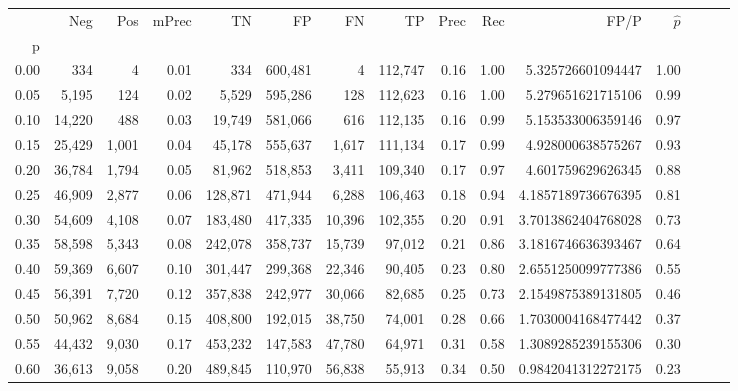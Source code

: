 \begin{tabular}{rrrrrrrrrrrrrrr}
\toprule
{} &     Neg &    Pos & mPrec &       TN &       FP &       FN &       TP &  Prec &   Rec &                  FP/P & $\hat{p}$ \\
p    &         &        &       &          &          &          &          &       &       &                       &           \\
\midrule
0.00 &     334 &      4 &  0.01 &      334 &  600,481 &        4 &  112,747 &  0.16 &  1.00 &     5.325726601094447 &      1.00 \\
0.05 &   5,195 &    124 &  0.02 &    5,529 &  595,286 &      128 &  112,623 &  0.16 &  1.00 &     5.279651621715106 &      0.99 \\
0.10 &  14,220 &    488 &  0.03 &   19,749 &  581,066 &      616 &  112,135 &  0.16 &  0.99 &     5.153533006359146 &      0.97 \\
0.15 &  25,429 &  1,001 &  0.04 &   45,178 &  555,637 &    1,617 &  111,134 &  0.17 &  0.99 &     4.928000638575267 &      0.93 \\
0.20 &  36,784 &  1,794 &  0.05 &   81,962 &  518,853 &    3,411 &  109,340 &  0.17 &  0.97 &     4.601759629626345 &      0.88 \\
0.25 &  46,909 &  2,877 &  0.06 &  128,871 &  471,944 &    6,288 &  106,463 &  0.18 &  0.94 &    4.1857189736676395 &      0.81 \\
0.30 &  54,609 &  4,108 &  0.07 &  183,480 &  417,335 &   10,396 &  102,355 &  0.20 &  0.91 &    3.7013862404768028 &      0.73 \\
0.35 &  58,598 &  5,343 &  0.08 &  242,078 &  358,737 &   15,739 &   97,012 &  0.21 &  0.86 &    3.1816746636393467 &      0.64 \\
0.40 &  59,369 &  6,607 &  0.10 &  301,447 &  299,368 &   22,346 &   90,405 &  0.23 &  0.80 &    2.6551250099777386 &      0.55 \\
0.45 &  56,391 &  7,720 &  0.12 &  357,838 &  242,977 &   30,066 &   82,685 &  0.25 &  0.73 &    2.1549875389131805 &      0.46 \\
0.50 &  50,962 &  8,684 &  0.15 &  408,800 &  192,015 &   38,750 &   74,001 &  0.28 &  0.66 &    1.7030004168477442 &      0.37 \\
0.55 &  44,432 &  9,030 &  0.17 &  453,232 &  147,583 &   47,780 &   64,971 &  0.31 &  0.58 &    1.3089285239155306 &      0.30 \\
0.60 &  36,613 &  9,058 &  0.20 &  489,845 &  110,970 &   56,838 &   55,913 &  0.34 &  0.50 &    0.9842041312272175 &      0.23 \\

\end{tabular}
